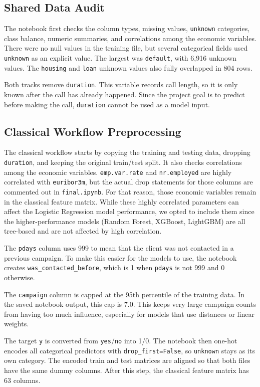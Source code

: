 \documentclass[10pt,twocolumn]{article}
\begin{document}
\subsection{Shared Data Audit}
The notebook first checks the column types, missing values, \texttt{unknown} categories, class balance, numeric summaries, and correlations among the economic variables. There were no null values in the training file, but several categorical fields used \texttt{unknown} as an explicit value. The largest was \texttt{default}, with 6{,}916 unknown values. The \texttt{housing} and \texttt{loan} unknown values also fully overlapped in 804 rows.

Both tracks remove \texttt{duration}. This variable records call length, so it is only known after the call has already happened. Since the project goal is to predict before making the call, \texttt{duration} cannot be used as a model input.

\subsection{Classical Workflow Preprocessing}
The classical workflow starts by copying the training and testing data, dropping \texttt{duration}, and keeping the original train/test split. It also checks correlations among the economic variables. \texttt{emp.var.rate} and \texttt{nr.employed} are highly correlated with \texttt{euribor3m}, but the actual drop statements for those columns are commented out in \texttt{final.ipynb}. For that reason, those economic variables remain in the classical feature matrix. While these highly correlated parameters can affect the Logistic Regression model performance, we opted to include them since the higher-performance models (Random Forest, XGBoost, LightGBM) are all tree-based and are not affected by high correlation.

The \texttt{pdays} column uses 999 to mean that the client was not contacted in a previous campaign. To make this easier for the models to use, the notebook creates \texttt{was\_contacted\_before}, which is 1 when \texttt{pdays} is not 999 and 0 otherwise.

The \texttt{campaign} column is capped at the 95th percentile of the training data. In the saved notebook output, this cap is 7.0. This keeps very large campaign counts from having too much influence, especially for models that use distances or linear weights.

The target \texttt{y} is converted from \texttt{yes}/\texttt{no} into 1/0. The notebook then one-hot encodes all categorical predictors with \texttt{drop\_first=False}, so \texttt{unknown} stays as its own category. The encoded train and test matrices are aligned so that both files have the same dummy columns. After this step, the classical feature matrix has 63 columns.
\end{document}
